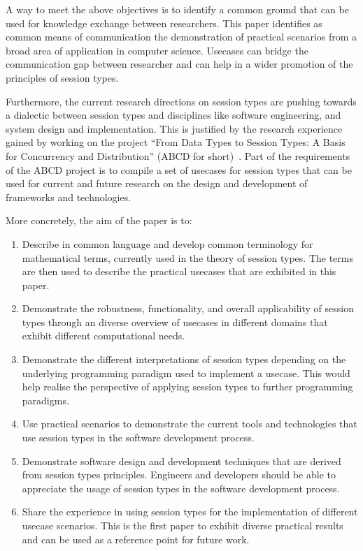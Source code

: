 A way to meet the above objectives is to identify a common
ground that can be used for knowledge exchange between researchers.
This paper identifies as common means of communication the demonstration
of practical scenarios from a broad area of application in computer science.
Usecases can bridge the communication gap between researcher and can help
in a wider promotion of the principles of session types.

Furthermore, the current research directions on session types are
pushing towards a dialectic between session types and disciplines
like software engineering, and system design and implementation.
This is justified by the research experience gained by working
on the project
``From Data Types to Session Types: A Basis for Concurrency and Distribution''
(ABCD for short)~\cite{ABCD}.
Part of the requirements of the ABCD project is to compile a set of usecases
for session types that can be used for current and future research on
the design and development of frameworks and technologies.

More concretely, the aim of the paper is to:
%
\begin{enumerate}
	\item	Describe in common language and develop common terminology
			for mathematical terms, currently used in the theory of
			session types.
			The terms are then used to describe the practical usecases
			that are exhibited in this paper.

	\item	Demonstrate the robustness, functionality, and overall applicability
			of session types through an diverse overview of usecases in
			different domains that exhibit different computational needs.

	\item	Demonstrate the different interpretations of
			session types depending on the underlying programming paradigm
			used to implement a usecase.
			This would help realise the perspective of applying session types to
			further programming paradigms.


	\item	Use practical scenarios to demonstrate the current tools and
			technologies that use session types in the software development
			process.

	\item	Demonstrate software design and development techniques that
			are derived from session types principles. Engineers and
			developers should be able to appreciate the usage of session types
			in the software development process.
		
	\item	Share the experience in using session types for the
			implementation of different usecase scenarios. This
			is the first paper to exhibit diverse practical results
			and can be used as a reference point for future work.
\end{enumerate}

